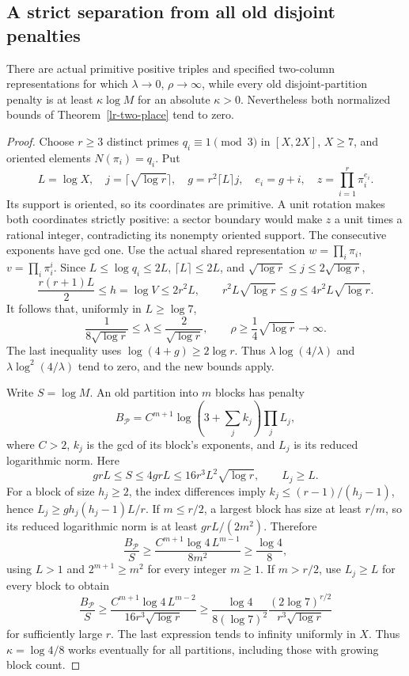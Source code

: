 \subsection{A strict separation from all old disjoint penalties}
\begin{theorem}
\label{lr-partition-separation}
There are actual primitive positive triples and specified two-column
representations for which $\lambda\to0$, $\rho\to\infty$, while every
old disjoint-partition penalty is at least $\kappa\log M$ for an absolute
$\kappa>0$. Nevertheless both normalized bounds of
Theorem~\ref{lr-two-place} tend to zero.
\end{theorem}
\begin{proof}
Choose $r\ge3$ distinct primes $q_i\equiv1\pmod3$ in $[X,2X]$, $X\ge7$,
and oriented elements $N(\pi_i)=q_i$. Put
\[
 L=\log X,\quad j=\lceil\sqrt{\log r}\rceil,\quad
 g=r^2\lceil L\rceil j,\quad e_i=g+i,
 \quad z=\prod_{i=1}^r\pi_i^{e_i}.
\]
Its support is oriented, so its coordinates are primitive. A unit rotation
makes both coordinates strictly positive: a sector boundary would make $z$
a unit times a rational integer, contradicting its nonempty oriented
support. The consecutive exponents have gcd one. Use the actual shared
representation $w=\prod_i\pi_i$, $v=\prod_i\pi_i^i$.
Since $L\le\log q_i\le2L$, $\lceil L\rceil\le2L$, and
$\sqrt{\log r}\le j\le2\sqrt{\log r}$,
\[
 \frac{r(r+1)L}{2}\le h=\log V\le2r^2L,\qquad
 r^2L\sqrt{\log r}\le g\le4r^2L\sqrt{\log r}.
\]
It follows that, uniformly in $L\ge\log7$,
\begin{equation}\label{lr-separation-lambda}
 \frac1{8\sqrt{\log r}}\le\lambda\le\frac2{\sqrt{\log r}},
 \qquad \rho\ge\frac14\sqrt{\log r}\longrightarrow\infty.
\end{equation}
The last inequality uses $\log(4+g)\ge2\log r$.
Thus $\lambda\log(4/\lambda)$ and $\lambda\log^2(4/\lambda)$ tend
to zero, and the new bounds apply.

Write $S=\log M$. An old partition into $m$ blocks has penalty
\[
 B_{\mathcal P}=C^{m+1}\log(3+\textstyle\sum_j k_j)\prod_j L_j,
\]
where $C>2$, $k_j$ is the gcd of its block's exponents, and $L_j$ is its
reduced logarithmic norm. Here
\[
 grL\le S\le4grL\le16r^3L^2\sqrt{\log r},\qquad L_j\ge L.
\]
For a block of size $h_j\ge2$, the index differences imply
$k_j\le(r-1)/(h_j-1)$, hence
$L_j\ge gh_j(h_j-1)L/r$. If $m\le r/2$, a largest block has size
at least $r/m$, so its reduced logarithmic norm is at least
$grL/(2m^2)$. Therefore
\[
 \frac{B_{\mathcal P}}S
 \ge\frac{C^{m+1}\log4\,L^{m-1}}{8m^2}
 \ge\frac{\log4}{8},
\]
using $L>1$ and $2^{m+1}\ge m^2$ for every integer $m\ge1$.
If $m>r/2$, use $L_j\ge L$ for every block to obtain
\[
 \frac{B_{\mathcal P}}S
 \ge\frac{C^{m+1}\log4\,L^{m-2}}{16r^3\sqrt{\log r}}
 \ge\frac{\log4}{8(\log7)^2}
       \frac{(2\log7)^{r/2}}{r^3\sqrt{\log r}}
\]
for sufficiently large $r$. The last expression tends to infinity
uniformly in $X$. Thus $\kappa=\log4/8$ works eventually for all
partitions, including those with growing block count.


\end{proof}
